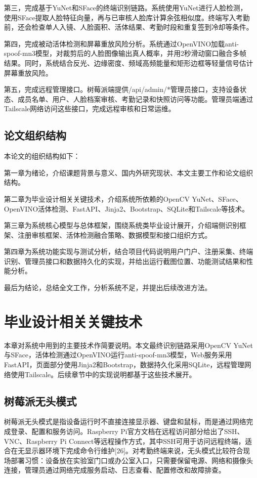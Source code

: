 \documentclass[UTF8]{heuthesis}
\begin{document}
第三，完成基于YuNet和SFace的终端识别链路。系统使用YuNet进行人脸检测，使用SFace提取人脸特征向量，再与已审核人脸库计算余弦相似度。终端写入考勤前，还会检查单人入镜、人脸面积、活体结果、考勤时段和重复签到冷却等条件。

第四，完成被动活体检测和屏幕重放风险分析。系统通过OpenVINO加载anti-spoof-mn3模型，对裁剪后的人脸图像输出真人概率，并用2秒滑动窗口融合多帧结果。同时，系统结合反光、边缘密度、频域高频能量和矩形边框等轻量信号估计屏幕重放风险。

第五，完成远程管理接口。树莓派端提供/api/admin/*管理员接口，支持设备状态、成员名单、用户、人脸档案审核、考勤记录和快照访问等功能。管理员端通过Tailscale网络访问这些接口，完成远程审核和日常运维。

\section{论文组织结构}
本论文的组织结构如下：

第一章为绪论，介绍课题背景与意义、国内外研究现状、本文主要工作和论文组织结构。

第二章为毕业设计相关关键技术，介绍系统所依赖的OpenCV YuNet、SFace、OpenVINO活体检测、FastAPI、Jinja2、Bootstrap、SQLite和Tailscale等技术。

第三章为系统核心模型与总体框架，围绕系统类毕业设计展开，介绍端侧识别框架、注册审核框架、活体检测融合策略、数据模型和接口组织方式。

第四章为系统功能实现与测试分析，结合项目代码说明用户门户、注册采集、终端识别、管理员接口和数据持久化的实现，并给出运行截图位置、功能测试结果和性能分析。

最后为结论，总结全文工作，分析系统不足，并提出后续改进方法。

\chapter{毕业设计相关关键技术}
本章对系统中用到的主要技术作简要说明。本文最终识别链路采用OpenCV YuNet与SFace，活体检测通过OpenVINO运行anti-spoof-mn3模型，Web服务采用FastAPI，页面部分使用Jinja2和Bootstrap，数据持久化采用SQLite，远程管理网络使用Tailscale。后续章节中的实现说明都基于这些技术展开。

\section{树莓派无头模式}
树莓派无头模式是指设备运行时不直接连接显示器、键盘和鼠标，而是通过网络完成登录、配置和服务访问。Raspberry Pi官方文档在远程访问部分给出了SSH、VNC、Raspberry Pi Connect等远程操作方式，其中SSH可用于访问远程终端，适合在无显示器环境下完成命令行维护[26]。对考勤终端来说，无头模式比较符合现场部署习惯：设备放在实验室门口或办公室入口，只需要保留电源、网络和摄像头连接，管理员通过网络完成服务启动、日志查看、配置修改和故障排查。
\end{document}
